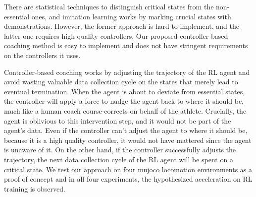 \documentclass[journal]{IEEEtran}
\begin{document}
There are statistical techniques to distinguish critical states from the non-essential ones, and imitation learning works by marking crucial states with demonstrations. However, the former approach is hard to implement, and the latter one requires high-quality controllers. Our proposed controller-based coaching method is easy to implement and does not have stringent requirements on the controllers it uses.

Controller-based coaching works by adjusting the trajectory of the RL agent and avoid wasting valuable data collection cycle on the states that merely lead to eventual termination. When the agent is about to deviate from essential states, the controller will apply a force to nudge the agent back to where it should be, much like a human coach course-corrects on behalf of the athlete. Crucially, the agent is oblivious to this intervention step, and it would not be part of the agent's data. Even if the controller can't adjust the agent to where it should be, because it is a high quality controller, it would not have mattered since the agent is unaware of it. On the other hand, if the controller successfully adjusts the trajectory, the next data collection cycle of the RL agent will be spent on a critical state. We test our approach on four mujoco locomotion environments as a proof of concept and in all four experiments, the hypothesized acceleration on RL training is observed.
\end{document}
